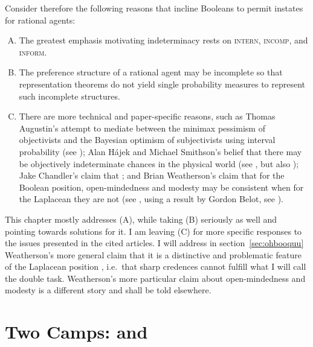 \documentclass[phd,12pt,oneside]{ubcthesis}
\begin{document}
Consider therefore the following reasons that incline Booleans to
permit instates for rational agents:

\begin{enumerate}[(A)]
\item The greatest emphasis motivating indeterminacy rests on
  \textsc{intern}, \textsc{incomp}, and \textsc{inform}.
\item The preference structure of a rational agent may be incomplete
  so that representation theorems do not yield single probability
  measures to represent such incomplete
  structures.\label{page:houwieve}
\item There are more technical and paper-specific reasons, such as
  Thomas Augustin's attempt to mediate between the minimax pessimism
  of objectivists and the Bayesian optimism of subjectivists using
  interval probability (see ); Alan
  H{\'a}jek and Michael Smithson's belief that there may be
  objectively indeterminate chances in the physical world (see
  , but also ); Jake Chandler's claim that 
  ; and Brian Weatherson's claim that for the
  Boolean position, open-mindedness and modesty may be consistent when
  for the Laplacean they are not (see , using
  a result by Gordon Belot, see ).
\end{enumerate}

This chapter mostly addresses (A), while taking (B) seriously as well
and pointing towards solutions for it. I am leaving (C) for more
specific responses to the issues presented in the cited articles. I
will address in section~\ref{sec:ohbooquu} Weatherson's more general
claim that it is a distinctive and problematic feature of the
Laplacean position 
, i.e.\ that sharp credences cannot fulfill
what I will call the double task. Weatherson's more
particular claim about open-mindedness and modesty is a different
story and shall be told elsewhere.

\section{Two Camps: {\anderson} and {\augustin}}
\label{sec:ulolumei}
\end{document}
